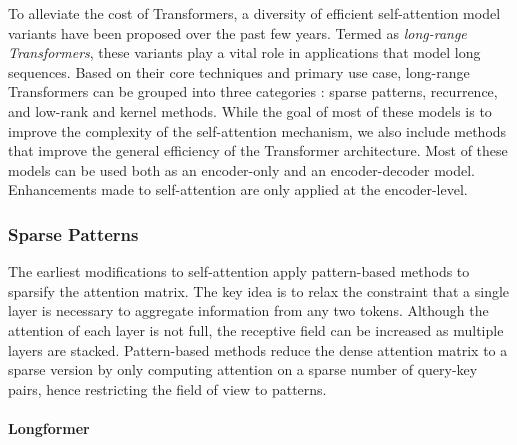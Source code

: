 To alleviate the cost of Transformers, a diversity of efficient self-attention model variants \citep{tay2020efficient} have been proposed over the past few years. Termed as \textit{long-range Transformers}, these variants play a vital role in applications that model long sequences. Based on their core techniques and primary use case, long-range Transformers can be grouped into three categories \citep{qin2022nlp}: sparse patterns, recurrence, and low-rank and kernel methods. While the goal of most of these models is to improve the complexity of the self-attention mechanism, we also include methods that improve the general efficiency of the Transformer architecture. Most of these models can be used both as an encoder-only and an encoder-decoder model. Enhancements made to self-attention are only applied at the encoder-level.

\subsubsection{Sparse Patterns}

The earliest modifications to self-attention apply pattern-based methods to sparsify the attention matrix. The key idea is to relax the constraint that a single layer is necessary to aggregate information from any two tokens. Although the attention of each layer is not full, the receptive field can be increased as multiple layers are stacked. Pattern-based methods reduce the dense attention matrix to a sparse version by only computing attention on a sparse number of query-key pairs, hence restricting the field of view to patterns. 

\paragraph{Longformer}

